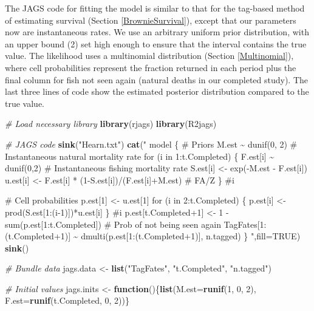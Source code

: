 \documentclass[
]{krantz}
\makeatletter
\newenvironment{Shaded}{\begin{snugshade}}{\end{snugshade}}
\newcommand{\AttributeTok}[1]{\textcolor[rgb]{0.27,0.27,0.27}{#1}}
\newcommand{\CommentTok}[1]{\textcolor[rgb]{0.37,0.37,0.37}{\textit{#1}}}
\newcommand{\ConstantTok}[1]{\textcolor[rgb]{0.37,0.37,0.37}{#1}}
\newcommand{\ControlFlowTok}[1]{\textcolor[rgb]{0.27,0.27,0.27}{\textbf{#1}}}
\newcommand{\DecValTok}[1]{\textcolor[rgb]{0.06,0.06,0.06}{#1}}
\newcommand{\FunctionTok}[1]{\textcolor[rgb]{0.27,0.27,0.27}{\textbf{#1}}}
\newcommand{\NormalTok}[1]{#1}
\newcommand{\OtherTok}[1]{\textcolor[rgb]{0.37,0.37,0.37}{#1}}
\newcommand{\StringTok}[1]{\textcolor[rgb]{0.5,0.5,0.5}{#1}}
\newenvironment{kframe}{%
\medskip{}
\setlength{\fboxsep}{.8em}
 \def\at@end@of@kframe{}%
 \ifinner\ifhmode%
  \def\at@end@of@kframe{\end{minipage}}%
  \begin{minipage}{\columnwidth}%
 \fi\fi%
 \def\FrameCommand##1{\hskip\@totalleftmargin \hskip-\fboxsep
 \colorbox{shadecolor}{##1}\hskip-\fboxsep
     \hskip-\linewidth \hskip-\@totalleftmargin \hskip\columnwidth}%
 \MakeFramed {\advance\hsize-\width
   \@totalleftmargin\z@ \linewidth\hsize
   \@setminipage}}%
 {\par\unskip\endMakeFramed%
 \at@end@of@kframe}
\renewenvironment{Shaded}{\begin{kframe}}{\end{kframe}}
\makeatother
\begin{document}
The JAGS code for fitting the model is similar to that for the tag-based method of estimating survival (Section \ref{BrownieSurvival}), except that our parameters now are instantaneous rates. We use an arbitrary uniform prior distribution, with an upper bound (2) set high enough to ensure that the interval contains the true value. The likelihood uses a multinomial distribution (Section \ref{Multinomial}), where cell probabilities represent the fraction returned in each period plus the final column for fish not seen again (natural deaths in our completed study). The last three lines of code show the estimated posterior distribution compared to the true value.

\begin{Shaded}
\begin{Highlighting}[]
\CommentTok{\# Load necessary library}
\FunctionTok{library}\NormalTok{(rjags)}
\FunctionTok{library}\NormalTok{(R2jags)}

\CommentTok{\# JAGS code}
\FunctionTok{sink}\NormalTok{(}\StringTok{"Hearn.txt"}\NormalTok{)}
\FunctionTok{cat}\NormalTok{(}\StringTok{"}
\StringTok{  model \{}
\StringTok{  \# Priors}
\StringTok{  M.est \textasciitilde{} dunif(0, 2)  \# Instantaneous natural mortality rate}
\StringTok{  for (i in 1:t.Completed) \{}
\StringTok{     F.est[i] \textasciitilde{} dunif(0,2) \# Instantaneous fishing mortality rate}
\StringTok{     S.est[i] \textless{}{-} exp({-}M.est {-} F.est[i])}
\StringTok{     u.est[i] \textless{}{-} F.est[i] * (1{-}S.est[i])/(F.est[i]+M.est) \# FA/Z}
\StringTok{  \} \#i}

\StringTok{\# Cell probabilities}
\StringTok{  p.est[1] \textless{}{-} u.est[1]}
\StringTok{  for (i in 2:t.Completed) \{}
\StringTok{    p.est[i] \textless{}{-} prod(S.est[1:(i{-}1)])*u.est[i]}
\StringTok{      \} \#i}
\StringTok{    p.est[t.Completed+1] \textless{}{-} 1 {-} sum(p.est[1:t.Completed])   \# Prob of not being seen again}
\StringTok{  TagFates[1:(t.Completed+1)] \textasciitilde{} dmulti(p.est[1:(t.Completed+1)], n.tagged)}
\StringTok{ \}}
\StringTok{  "}\NormalTok{,}\AttributeTok{fill=}\ConstantTok{TRUE}\NormalTok{)}
\FunctionTok{sink}\NormalTok{()}

\CommentTok{\# Bundle data}
\NormalTok{jags.data }\OtherTok{\textless{}{-}} \FunctionTok{list}\NormalTok{(}\StringTok{"TagFates"}\NormalTok{, }\StringTok{"t.Completed"}\NormalTok{, }\StringTok{"n.tagged"}\NormalTok{)}

\CommentTok{\# Initial values}
\NormalTok{jags.inits }\OtherTok{\textless{}{-}} \ControlFlowTok{function}\NormalTok{()\{}\FunctionTok{list}\NormalTok{(}\AttributeTok{M.est=}\FunctionTok{runif}\NormalTok{(}\DecValTok{1}\NormalTok{, }\DecValTok{0}\NormalTok{, }\DecValTok{2}\NormalTok{), }\AttributeTok{F.est=}\FunctionTok{runif}\NormalTok{(t.Completed, }\DecValTok{0}\NormalTok{, }\DecValTok{2}\NormalTok{))\}}


\end{Highlighting}
\end{Shaded}
\end{document}
